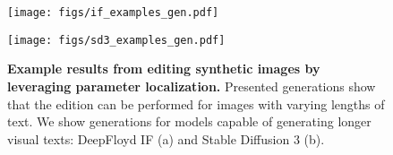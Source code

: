 \begin{figure}
    \centering
    \begin{minipage}[t]{1.0\linewidth}

        \vspace{0pt}
        \centering
        \texttt{[image: figs/if\_examples\_gen.pdf]}
    \end{minipage}

    \begin{minipage}[t]{1.0\linewidth}
        \vspace{20pt}
        \centering
        \texttt{[image: figs/sd3\_examples\_gen.pdf]}
    \end{minipage}
    \caption{\textbf{Example results from editing synthetic images by leveraging parameter localization.} Presented generations show that the edition can be performed for images with varying lengths of text. We show generations for models capable of generating longer visual texts: DeepFloyd IF (a) and Stable Diffusion 3 (b).\label{fig:ex_edition}}
\end{figure}
